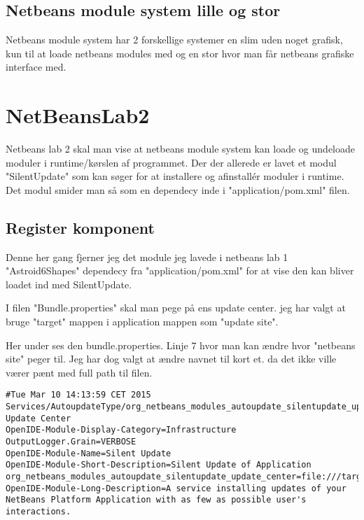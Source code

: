 \subsection{Netbeans module system lille og stor}
Netbeans module system har 2 forskellige systemer en slim uden noget grafisk,
kun til at loade netbeans modules med og en stor hvor man får netbeans grafiske
interface med.



\newpage
\section{NetBeansLab2}
Netbeans lab 2 skal man vise at netbeans module system kan loade og undeloade
moduler i runtime/kørslen af programmet. Der der allerede er lavet et modul
"SilentUpdate" som kan søger for at installere og afinstallér moduler i
runtime. Det modul smider man så som en dependecy inde i "application/pom.xml"
filen.

\subsection{Register komponent}
Denne her gang fjerner jeg det module jeg lavede i netbeans lab 1
"Astroid6Shapes" dependecy fra "application/pom.xml" for at vise den kan bliver
loadet ind med SilentUpdate.



I filen "Bundle.properties" skal man pege på ens update center. jeg har valgt at 
bruge "target" mappen i application mappen som "update site". 

Her under ses den bundle.properties. Linje 7 hvor man kan ændre hvor "netbeans
site" peger til.  Jeg har dog valgt at ændre navnet til kort et. da det ikke
ville værer pænt med full path til filen.

\begin{lstlisting}[caption={Bundle.properties}, label={lst:App}]
#Tue Mar 10 14:13:59 CET 2015
Services/AutoupdateType/org_netbeans_modules_autoupdate_silentupdate_update_center.instance=Sample Update Center
OpenIDE-Module-Display-Category=Infrastructure
OutputLogger.Grain=VERBOSE
OpenIDE-Module-Name=Silent Update
OpenIDE-Module-Short-Description=Silent Update of Application
org_netbeans_modules_autoupdate_silentupdate_update_center=file:///target/netbeans_site/updates.xml
OpenIDE-Module-Long-Description=A service installing updates of your NetBeans Platform Application with as few as possible user's interactions.
\end{lstlisting}


